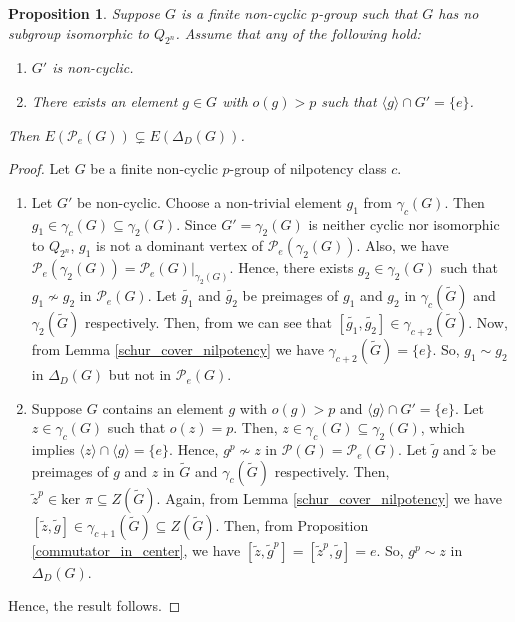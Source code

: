 \documentclass[12pt,a4paper]{article}
\newtheorem{proposition}[theorem]{Proposition}
\begin{document}
\begin{proposition}\label{noncyclic_commutator}
Suppose $G$ is a finite non-cyclic $p$-group such that $G$ has no subgroup isomorphic to $Q_{2^n}$. Assume that any of the following hold:  
\begin{enumerate}[\rm (i)]
    \item $G'$ is non-cyclic.
    \item There exists an element $g\in G$ with $o(g)>p$ such that $\langle g\rangle\cap G'=\{e\}$. 
\end{enumerate}
Then $E(\mathcal{P}_e(G))\subsetneq E(\Delta_D(G))$.
\end{proposition}
\begin{proof} 
Let $G$ be a finite non-cyclic $p$-group of nilpotency class $c$.
\begin{enumerate}[\rm (i)]
    \item Let $G'$ be non-cyclic. Choose a non-trivial element $g_1$ from $\gamma_c(G)$. Then $g_1\in \gamma_c(G)\subseteq \gamma_2(G)$. Since $G'=\gamma_2(G)$ is neither cyclic nor isomorphic to $Q_{2^n}$, $g_1$ is not a dominant vertex of $\mathcal{P}_e(\gamma_2(G))$. Also, we have $\mathcal{P}_e(\gamma_2(G))=\mathcal{P}_e(G)\vert_{\gamma_2(G)}$. Hence, there exists $g_2\in\gamma_2(G)$ such that $g_1\nsim g_2$ in $\mathcal{P}_e(G)$. Let $\tilde{g_1}$ and $\tilde{g_2}$ be preimages of $g_1$ and $g_2$ in $\gamma_{c}(\tilde{G})$ and $\gamma_{2}(\tilde{G})$ respectively. Then, from \cite[Lemma 3.2.6]{karpi} we can see that $[\tilde{g_1},\tilde{g_2}]\in \gamma_{c+2}(\tilde{G})$. Now, from Lemma \ref{schur_cover_nilpotency} we have $\gamma_{c+2}(\tilde{G})=\{e\}$. So, $g_1\sim g_2$ in $\Delta_D(G)$ but not in $\mathcal{P}_e(G)$. 

    \item Suppose $G$ contains an element $g$ with $o(g)>p$ and $\langle g\rangle\cap G'=\{e\}$. Let $z\in\gamma_{c}(G)$ such that $o(z)=p$. Then, $z\in\gamma_{c}(G)\subseteq\gamma_2(G)$, which implies $\langle z\rangle\cap\langle g\rangle=\{e\}$. Hence, $g^{p}\nsim z$ in $\mathcal{P}(G)=\mathcal{P}_e(G)$. Let $\tilde{g}$ and $\tilde{z}$ be preimages of $g$ and $z$ in $\tilde{G}$ and $\gamma_{c}(\tilde{G})$ respectively. Then, $\tilde{z}^p\in \text{ker }\pi\subseteq Z(\tilde{G})$. Again, from Lemma \ref{schur_cover_nilpotency} we have $[\tilde{z},\tilde{g}]\in \gamma_{c+1}(\tilde{G})\subseteq Z(\tilde{G})$. Then, from Proposition \ref{commutator_in_center}, we have $[\tilde{z},\tilde{g}^p]=[\tilde{z}^p,\tilde{g}]=e$. So, $g^{p}\sim z$ in $\Delta_D(G)$. 
\end{enumerate}
Hence, the result follows.
\end{proof}
\end{document}
